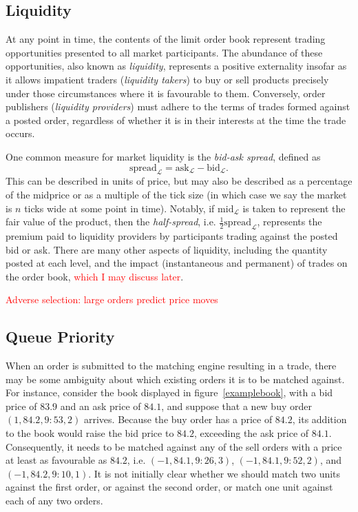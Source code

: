 \documentclass[honours,12pt]{unswthesis}
\numberwithin{equation}{section}
\begin{document}
\subsection{Liquidity}
At any point in time, the contents of the limit order book represent trading opportunities presented to all market participants. The abundance of these opportunities, also known as \textit{liquidity}, represents a positive externality insofar as it allows impatient traders (\textit{liquidity takers}) to buy or sell products precisely under those circumstances where it is favourable to them. Conversely, order publishers (\textit{liquidity providers}) must adhere to the terms of trades formed against a posted order, regardless of whether it is in their interests at the time the trade occurs.

One common measure for market liquidity is the \textit{bid-ask spread}, defined as
	$$\text{spread}_\mathcal{L} = \text{ask}_\mathcal{L} - \text{bid}_\mathcal{L}.$$
This can be described in units of price, but may also be described as a percentage of the midprice or as a multiple of the tick size (in which case we say the market is $n$ ticks wide at some point in time).
Notably, if $\text{mid}_\mathcal{L}$ is taken to represent the fair value of the product, then the \textit{half-spread}, i.e. $\frac{1}{2}\text{spread}_\mathcal{L}$, represents the premium paid to liquidity providers by participants trading against the posted bid or ask. There are many other aspects of liquidity, including the quantity posted at each level, and the impact (instantaneous and permanent) of trades on the order book, \textcolor{red}{which I may discuss later}.

\textcolor{red}{Adverse selection: large orders predict price moves}

\subsection{Queue Priority}
When an order is submitted to the matching engine resulting in a trade, there may be some ambiguity about which existing orders it is to be matched against. For instance, consider the book displayed in figure~\ref{examplebook}, with a bid price of $83.9$ and an ask price of $84.1$, and suppose that a new buy order $(1,84.2,9:53,2)$ arrives. Because the buy order has a price of $84.2$, its addition to the book would raise the bid price to $84.2$, exceeding the ask price of $84.1$. Consequently, it needs to be matched against any of the sell orders with a price at least as favourable as $84.2$, i.e. $(-1,84.1,9:26,3)$, $(-1,84.1,9:52,2)$, and $(-1,84.2,9:10,1)$. It is not initially clear whether we should match two units against the first order, or against the second order, or match one unit against each of any two orders.
\end{document}
